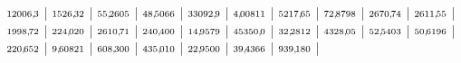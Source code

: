 \documentclass[12pt,fleqn]{article}
\theoremstyle{aufg}
\theoremstyle{bsp}
\begin{document}
\begin{flushleft}
$ \scriptstyle12006,\hspace{-1pt}3$ | $ \scriptstyle1526,\hspace{-1pt}32$ | $ \scriptstyle55,\hspace{-1pt}2605$ | $ \scriptstyle48,\hspace{-1pt}5066$ | $ \scriptstyle33092,\hspace{-1pt}9$ | $ \scriptstyle4,\hspace{-1pt}00811$ | $ \scriptstyle5217,\hspace{-1pt}65$ | $ \scriptstyle72,\hspace{-1pt}8798$ | $ \scriptstyle2670,\hspace{-1pt}74$ | $ \scriptstyle2611,\hspace{-1pt}55$ | $ \scriptstyle1998,\hspace{-1pt}72$ | $ \scriptstyle224,\hspace{-1pt}020$ | $ \scriptstyle2610,\hspace{-1pt}71$ | $ \scriptstyle240,\hspace{-1pt}400$ | $ \scriptstyle14,\hspace{-1pt}9579$ | $ \scriptstyle45350,\hspace{-1pt}0$ | $ \scriptstyle32,\hspace{-1pt}2812$ | $ \scriptstyle4328,\hspace{-1pt}05$ | $ \scriptstyle52,\hspace{-1pt}5403$ | $ \scriptstyle50,\hspace{-1pt}6196$ | $ \scriptstyle220,\hspace{-1pt}652$ | $ \scriptstyle9,\hspace{-1pt}60821$ | $ \scriptstyle608,\hspace{-1pt}300$ | $ \scriptstyle435,\hspace{-1pt}010$ | $ \scriptstyle22,\hspace{-1pt}9500$ | $ \scriptstyle39,\hspace{-1pt}4366$ | $ \scriptstyle939,\hspace{-1pt}180$ | \end{flushleft} 
\end{document}
